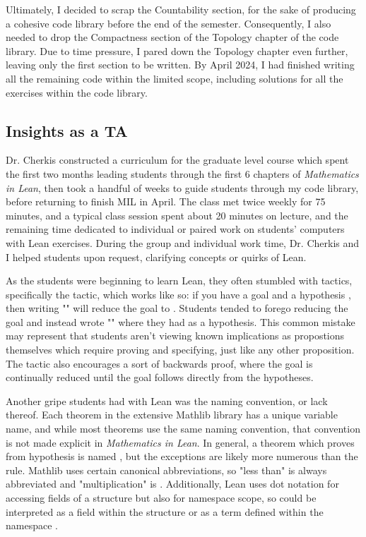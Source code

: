 Ultimately,
I decided to scrap the Countability section, for the sake of producing a 
cohesive code library before the end of the semester. Consequently, I also
needed to drop the Compactness section of the Topology chapter of
the code library. Due to time pressure, I pared down the Topology chapter
even further, leaving only the first section to be written. By April 2024, 
I had finished writing all the remaining code within the limited scope, 
including solutions for all the exercises within the code library.

\subsection{Insights as a TA}

Dr. Cherkis constructed a curriculum for the graduate level course 
which spent the first two months leading students through the first 6
chapters of \textit{Mathematics in Lean}, then took a handful of weeks to 
guide students through my code library, before returning to finish 
MIL in April. The class met twice weekly for 75 minutes, and a typical class
session spent about 20 minutes on lecture, and the remaining time dedicated
to individual or paired work on students' computers with Lean exercises. During
the group and individual work time, Dr. Cherkis and I helped students upon 
request, clarifying concepts or quirks of Lean.

As the students were beginning to learn Lean, they often stumbled with
tactics, specifically the  tactic, which works like so:
if you have a goal  and a hypothesis , 
then writing "" will reduce the goal to . 
Students tended to forego reducing the goal and instead wrote 
"" where they had  as a hypothesis. This common
mistake may represent that students aren't viewing known implications as
propostions themselves which require proving and specifying, just like
any other proposition. The  tactic also encourages a sort of
backwards proof, where the goal is continually reduced until the goal 
follows directly from the hypotheses. 

Another gripe students had with Lean was the naming convention, or lack
thereof. Each theorem in the extensive Mathlib library has a unique
variable name, and while most theorems use the same naming convention, that
convention is not made explicit in \textit{Mathematics in Lean}. In general, 
a theorem which proves  from hypothesis  is named
, but the exceptions are likely more numerous than
the rule. Mathlib uses certain canonical abbreviations, so "less than" is
always abbreviated  and "multiplication" is . Additionally,
Lean uses dot notation for accessing fields of a structure but also
for namespace scope, so  could be 
interpreted as a field within the structure  or as
a term defined within the namespace . 

